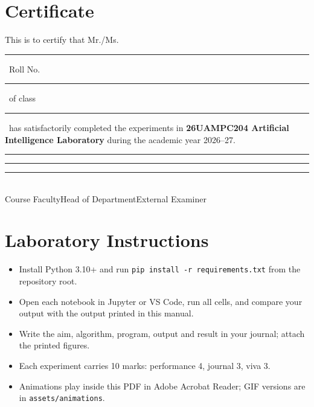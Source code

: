\documentclass[11pt]{article}
\begin{document}
\section*{Certificate}
\begin{tcolorbox}[enhanced,colback=ivory,colframe=gold,boxrule=1.2pt,arc=3mm,left=8mm,right=8mm,top=6mm,bottom=6mm]
\large This is to certify that Mr./Ms.\ \rule{7cm}{0.4pt}\ Roll No.\ \rule{2.5cm}{0.4pt}\ of class \rule{3cm}{0.4pt}\ has satisfactorily completed the experiments in \textbf{26UAMPC204 Artificial Intelligence Laboratory} during the academic year 2026--27.\\[3cm]
\rule{4.5cm}{0.4pt}\hfill\rule{4.5cm}{0.4pt}\hfill\rule{4.5cm}{0.4pt}\\ Course Faculty\hfill Head of Department\hfill External Examiner
\end{tcolorbox}
\section*{Laboratory Instructions}
\begin{itemize}\item Install Python 3.10+ and run \texttt{pip install -r requirements.txt} from the repository root.
\item Open each notebook in Jupyter or VS Code, run all cells, and compare your output with the output printed in this manual.
\item Write the aim, algorithm, program, output and result in your journal; attach the printed figures.
\item Each experiment carries 10 marks: performance 4, journal 3, viva 3.
\item Animations play inside this PDF in Adobe Acrobat Reader; GIF versions are in \texttt{assets/animations}.\end{itemize}
\end{document}

